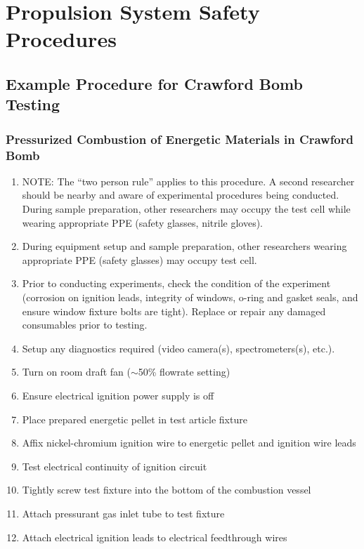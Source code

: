 \section{Propulsion System Safety Procedures} \label{section:prop-appendix}

\subsection{Example Procedure for Crawford Bomb Testing}

\subsubsection*{Pressurized Combustion of Energetic Materials in Crawford Bomb}
\begin{enumerate}
    \item NOTE: The ``two person rule'' applies to this procedure. A second researcher should be nearby and aware of experimental procedures being conducted. During sample preparation, other researchers may occupy the test cell while wearing appropriate PPE (safety glasses, nitrile gloves).
    \item During equipment setup and sample preparation, other researchers wearing
    appropriate PPE (safety glasses) may occupy test cell.
    \item Prior to conducting experiments, check the condition of the experiment (corrosion on
    ignition leads, integrity of windows, o-ring and gasket seals, and ensure window fixture
    bolts are tight). Replace or repair any damaged consumables prior to testing.
    \item Setup any diagnostics required (video camera(s), spectrometers(s), etc.).
    \item Turn on room draft fan (\(\sim\)50\% flowrate setting)
    \item Ensure electrical ignition power supply is off
    \item Place prepared energetic pellet in test article fixture
    \item Affix nickel-chromium ignition wire to energetic pellet and ignition wire leads
    \item Test electrical continuity of ignition circuit
    \item Tightly screw test fixture into the bottom of the combustion vessel
    \item Attach pressurant gas inlet tube to test fixture
    \item Attach electrical ignition leads to electrical feedthrough wires

\end{enumerate}
